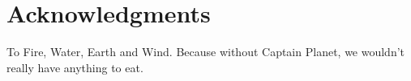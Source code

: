 \chapter*{Acknowledgments}
To Fire, Water, Earth and Wind. Because without Captain Planet, we wouldn't really have anything to eat.
